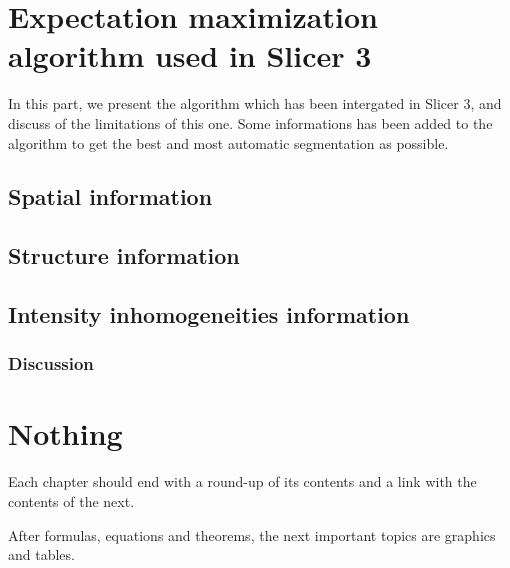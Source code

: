 \section{Expectation maximization algorithm used in Slicer 3}\label{angels}
In this part, we present the algorithm which has been intergated in Slicer 3, and discuss of the limitations of this one. Some informations has been added to the algorithm to get the best and most automatic segmentation as possible.
%
\subsection{Spatial information}
%
\subsection{Structure information}
%
\subsection{Intensity inhomogeneities information}
%
\subsubsection{Discussion}
%
\section{Nothing}
Each chapter should end with a round-up of its contents and a link
with the contents of the next.
\par
After formulas, equations and theorems, the next important
topics are graphics and tables.
